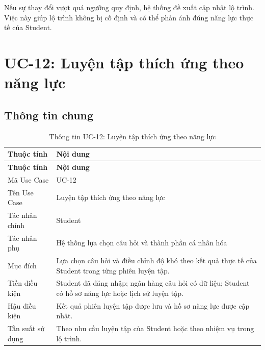 Nếu sự thay đổi vượt quá ngưỡng quy định, hệ thống đề xuất cập nhật lộ
trình. Việc này giúp lộ trình không bị cố định và có thể phản ánh đúng
năng lực thực tế của Student.

\section{UC-12: Luyện tập thích ứng theo năng lực}
\label{sec:uc12-adaptive-practice}

\subsection{Thông tin chung}

\begin{longtable}{|p{4.2cm}|p{10.2cm}|}
	\caption{Thông tin UC-12: Luyện tập thích ứng theo năng lực}
	\label{tab:uc12-info}\\
	\hline
	\textbf{Thuộc tính} & \textbf{Nội dung} \\
	\hline
	\endfirsthead
	
	\hline
	\textbf{Thuộc tính} & \textbf{Nội dung} \\
	\hline
	\endhead
	
	Mã Use Case &
	UC-12 \\
	\hline
	
	Tên Use Case &
	Luyện tập thích ứng theo năng lực \\
	\hline
	
	Tác nhân chính &
	Student \\
	\hline
	
	Tác nhân phụ &
	Hệ thống lựa chọn câu hỏi và thành phần cá nhân hóa \\
	\hline
	
	Mục đích &
	Lựa chọn câu hỏi và điều chỉnh độ khó theo kết quả thực tế của Student
	trong từng phiên luyện tập. \\
	\hline
	
	Tiền điều kiện &
	Student đã đăng nhập; ngân hàng câu hỏi có dữ liệu; Student có hồ sơ năng
	lực hoặc lịch sử luyện tập. \\
	\hline
	
	Hậu điều kiện &
	Kết quả phiên luyện tập được lưu và hồ sơ năng lực được cập nhật. \\
	\hline
	
	Tần suất sử dụng &
	Theo nhu cầu luyện tập của Student hoặc theo nhiệm vụ trong lộ trình. \\
	\hline
	
\end{longtable}

